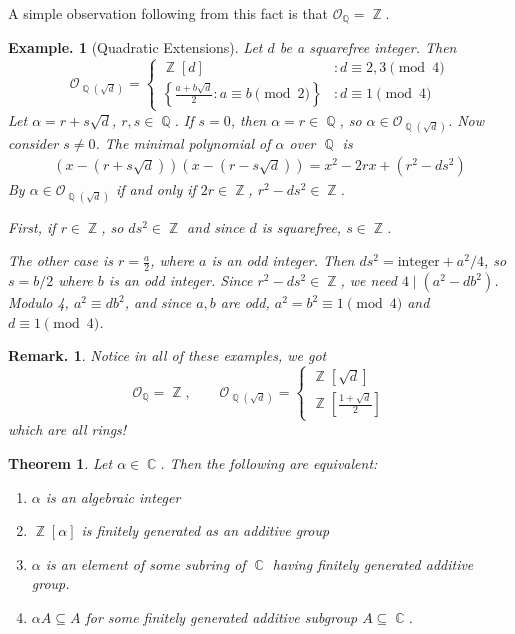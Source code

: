 \documentclass[11pt, a4paper]{memoir}
\DeclareMathOperator{\Q}{{\mathbb{Q}}}
\DeclareMathOperator{\Z}{{\mathbb{Z}}}
\DeclareMathOperator{\C}{{\mathbb{C}}}
\theoremstyle{change}
\newtheorem{theorem}{Theorem}[section]
\theoremstyle{plain}
\theoremstyle{nonumberplain}
\newtheorem{example}{Example.}
\newtheorem{remark}{Remark.}
\begin{document}
A simple observation following from this fact is that $\mathcal{O}_{\Q}=\Z$.
\begin{example}[Quadratic Extensions]
    Let $d$ be a squarefree integer.
    Then
    \begin{equation*}
        \mathcal{O}_{\Q(\sqrt{d})}=\begin{cases}
            \Z[d] &:d\equiv 2,3\pmod{4}\\
            \left\{\frac{a+b\sqrt{d}}{2}: a\equiv b\pmod{2}\right\} &:d\equiv 1\pmod{4}
        \end{cases}
    \end{equation*}
    Let $\alpha=r+s\sqrt{d}$, $r,s\in\Q$.
    If $s=0$, then $\alpha=r\in\Q$, so $\alpha\in\mathcal{O}_{\Q(\sqrt{d})}$.
    Now consider $s\neq 0$.
    The minimal polynomial of $\alpha$ over $\Q$ is
    \begin{align*}
        \left(x-(r+s\sqrt{d})\right)\left(x-(r-s\sqrt{d})\right) = x^2-2rx+(r^2-ds^2)
    \end{align*}
    By $\alpha\in\mathcal{O}_{\Q(\sqrt{d})}$ if and only if $2r\in\Z$, $r^2-ds^2\in\Z$.

    First, if $r\in\Z$, so $ds^2\in\Z$ and since $d$ is squarefree, $s\in\Z$.

    The other case is $r=\frac{a}{2}$, where $a$ is an odd integer.
    Then $ds^2=\text{integer}+a^2/4$, so $s=b/2$ where $b$ is an odd integer.
    Since $r^2-ds^2\in\Z$, we need $4\mid(a^2-db^2)$.
    Modulo 4, $a^2\equiv db^2$, and since $a,b$ are odd, $a^2=b^2\equiv 1\pmod{4}$ and $d\equiv 1\pmod{4}$.
\end{example}
\begin{remark}
    Notice in all of these examples, we got
    \begin{equation*}
        \mathcal{O}_{\Q}=\Z,\qquad\mathcal{O}_{\Q(\sqrt{d})}=\begin{cases}
            \Z[\sqrt{d}]\\\Z\left[\frac{1+\sqrt{d}}{2}\right]
        \end{cases}
    \end{equation*}
    which are all rings!
\end{remark}
\begin{theorem}\label{thm:algint}
    Let $\alpha\in\C$.
    Then the following are equivalent:
    \begin{enumerate}[nlr]
        \item $\alpha$ is an algebraic integer
        \item $\Z[\alpha]$ is finitely generated as an additive group
        \item $\alpha$ is an element of some subring of $\C$ having finitely generated additive group.
        \item $\alpha A\subseteq A$ for some finitely generated additive subgroup $A\subseteq\C$.
    \end{enumerate}
\end{theorem}
\end{document}
